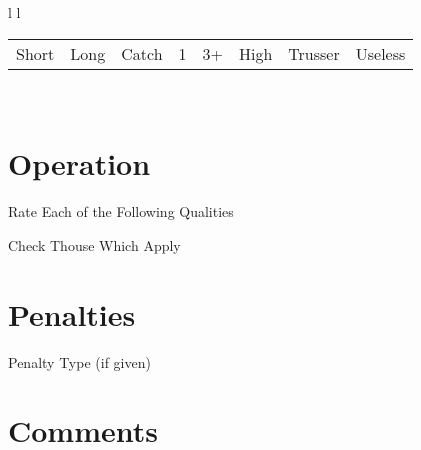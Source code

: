 \documentclass[english,pdf,pagemark,stamp]{sdaps}
\begin{document}
\begin{questionnaire}[noinfo]
\begin{tabular}{l l}
\begin{tabular}{ l l | l | l l | l | l l}
  \checkbox \hspace{1 mm} Short & \checkbox \hspace{1 mm} Long \hspace{3 mm} & \checkbox \hspace{1 mm} Catch \hspace{1 mm} & 1 \hspace{1 mm} \checkbox & 3+  \checkbox \hspace{1 mm} & \checkbox \hspace{1 mm} High \hspace{3 mm} & \checkbox \hspace{1 mm} Trusser & \checkbox \hspace{1 mm} Useless\\
\end{tabular}
\\

\end{tabular}

    \section{Operation}

\begin{multicols}{2}

    \begin{markgroup}{Rate Each of the Following Qualities}

    \end{markgroup}

\columnbreak

  \begin{choicequestion}[1]{Check Thouse Which Apply}
  \end{choicequestion}
\vspace{1 mm}

\end{multicols}

    \section{Penalties}


    \begin{choicequestion}[8]{Penalty Type (if given)}

    \end{choicequestion}

    \section{Comments}


  \end{questionnaire}
\end{document}

